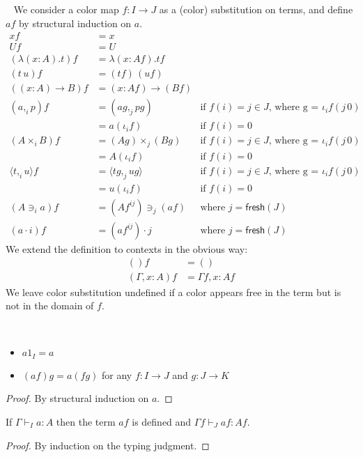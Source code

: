 \documentclass[english]{PaperTools/latex/lipics}
\newcommand\CP[3]{(#2,_{#1} #3)}
\newcommand\CTimes[2]{(#2) ×_{#1}}
\newcommand\op[1]{∋_{#1}}
\newcommand\fp[3]{⟨#2 ,_{#1} #3⟩}
\def\fresh#1{\mathsf{fresh}(#1)}
\begin{document}
\begin{definition}~
  \label{def:color-subst}
  We consider a color map $f : I → J$ as a (color) substitution on terms,
  and define $af$ by structural induction on $a$.
\begin{align*}
  x f & = x \\
  U f & = U \\
  (λ(x:A).t) f &= λ(x:Af).tf \\
  (t\,u) f &= (tf) \, (uf) \\
  ((x:A)→B) f &= (x:Af)→(Bf) \\
  \CP {i} a p f &= \CP {j} {ag} {pg}
    & \text{if $f(i) = j ∈ J$, where g = $ι_i f (j\,0)$} \\
    &= a(ι_if)
    & \text{if $f(i) = 0$} \\
  (A ×_i B) f &= \CTimes {j} {Ag} {(Bg)}
    & \text{if $f(i) = j ∈ J$, where g = $ι_i f (j\,0)$} \\
    &= A(ι_if)
    & \text{if $f(i) = 0$} \\
  \fp {i} t u f &= \fp {j} {tg} {ug}
    & \text{if $f(i) = j ∈ J$, where g = $ι_i f (j\,0)$} \\
    &= u(ι_if)
    & \text{if $f(i) = 0$} \\
  (A \op {i} a) f &= (Af^{ij}) \op {j} (af)
    & \text{where $j = \fresh J$} \\
  (a · i) f &= (af^{ij}) · j
    & \text{where $j = \fresh J$}
  \end{align*}
We extend the definition to contexts in the obvious way:
  \begin{align*}
  () f      &= () \\
  (Γ,x:A) f &= Γ f, x : A f
\end{align*}
We leave color substitution undefined if a color appears free in the
term but is not in the domain of $f$.
\end{definition}

\begin{theorem}~
  \begin{itemize}
  \item $a1_I = a$
  \item $(af)g = a(fg)$ for any $f: I → J$ and $g : J → K$
  \end{itemize}
\end{theorem}
\begin{proof}
  By structural induction on $a$.
\end{proof}

\begin{theorem}
  If $Γ ⊢_I a : A$ then the term
$af$ is defined and $Γ f ⊢_J af : Af$.
\end{theorem}
\begin{proof}
  By induction on the typing judgment.
\end{proof}
\end{document}
